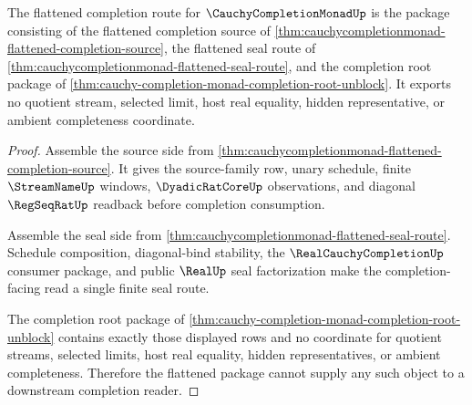 \begin{theorem}
\label{thm:cauchycompletionmonad-flattened-non-escape-package}
The flattened completion route for $\CauchyCompletionMonadUp$ is the package consisting of the flattened completion source of \autoref{thm:cauchycompletionmonad-flattened-completion-source}, the flattened seal route of \autoref{thm:cauchycompletionmonad-flattened-seal-route}, and the completion root package of \autoref{thm:cauchy-completion-monad-completion-root-unblock}. It exports no quotient stream, selected limit, host real equality, hidden representative, or ambient completeness coordinate.
\end{theorem}
\begin{proof}
Assemble the source side from \autoref{thm:cauchycompletionmonad-flattened-completion-source}. It gives the source-family row, unary schedule, finite $\StreamNameUp$ windows, $\DyadicRatCoreUp$ observations, and diagonal $\RegSeqRatUp$ readback before completion consumption.

Assemble the seal side from \autoref{thm:cauchycompletionmonad-flattened-seal-route}. Schedule composition, diagonal-bind stability, the $\RealCauchyCompletionUp$ consumer package, and public $\RealUp$ seal factorization make the completion-facing read a single finite seal route.

The completion root package of \autoref{thm:cauchy-completion-monad-completion-root-unblock} contains exactly those displayed rows and no coordinate for quotient streams, selected limits, host real equality, hidden representatives, or ambient completeness. Therefore the flattened package cannot supply any such object to a downstream completion reader.
\end{proof}

